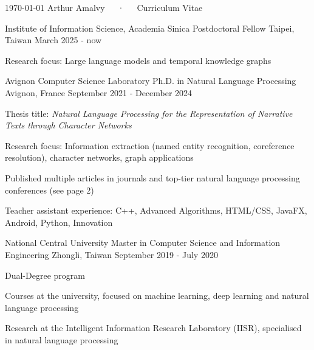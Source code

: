 \documentclass[11pt, a4paper]{awesome-cv}
\begin{document}
\makecvheader

\makecvfooter
  {\today}
  {Arthur Amalvy~~~·~~~Curriculum Vitae}
  {\thepage}



\begin{cventries}

  \cventry
  {Institute of Information Science, Academia Sinica}
  {Postdoctoral Fellow}
  {Taipei, Taiwan}
  {March 2025 - now}
  {
    \begin{cvitems}
      \item Research focus: Large language models and temporal knowledge graphs
    \end{cvitems}
  }

  \cventry
  {Avignon Computer Science Laboratory}
  {Ph.D. in Natural Language Processing}
  {Avignon, France}
  {September 2021 - December 2024}
  {
    \begin{cvitems}
      \item Thesis title: \textit{Natural Language Processing for the Representation of Narrative Texts through Character Networks}
      \item Research focus: Information extraction (named entity recognition, coreference resolution), character networks, graph applications
      \item Published multiple articles in journals and top-tier natural language processing conferences (see page 2)
      \item Teacher assistant experience: C++, Advanced Algorithms, HTML/CSS, JavaFX, Android, Python, Innovation
    \end{cvitems}
  }

  \cventry
  {National Central University}
  {Master in Computer Science and Information Engineering}
  {Zhongli, Taiwan}
  {September 2019 - July 2020}
  {
    \begin{cvitems} 
      \item Dual-Degree program
      \item Courses at the university, focused on machine learning, deep learning and natural language processing
      \item Research at the Intelligent Information Research Laboratory (IISR), specialised in natural language processing
    \end{cvitems}
  }

\end{cventries}
\end{document}
